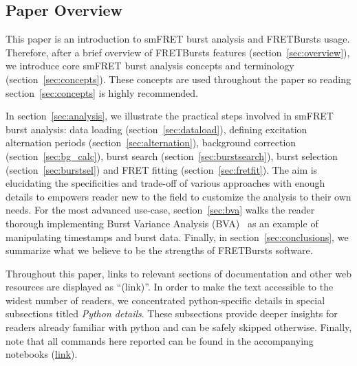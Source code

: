 \subsection{Paper Overview}
This paper is an introduction to smFRET burst analysis and FRETBursts usage.
Therefore, after a brief overview of FRETBursts features (section~\ref{sec:overview}),
we introduce core smFRET burst analysis concepts and terminology
(section~\ref{sec:concepts}). These concepts are used throughout the paper
so reading section~\ref{sec:concepts} is highly recommended.

In section~\ref{sec:analysis}, we illustrate the practical steps involved
in smFRET burst analysis: data loading (section~\ref{sec:dataload}), defining
excitation alternation periods (section~\ref{sec:alternation}), background
correction (section~\ref{sec:bg_calc}), burst search (section~\ref{sec:burstsearch}),
burst selection (section~\ref{sec:burstsel}) and FRET fitting (section~\ref{sec:fretfit}).
The aim is elucidating the specificities and trade-off of various approaches
with enough details to empowers reader new to the field to customize the analysis to their own needs.
For the most advanced use-case, section~\ref{sec:bva} walks the reader thorough implementing
Burst Variance Analysis (BVA)~\cite{Torella_2011} as an example of manipulating timestamps
and burst data.
Finally, in section~\ref{sec:conclusions}, we summarize what we believe to be
the strengths of FRETBursts software.

Throughout this paper,
links to relevant sections of documentation and other web resources
are displayed as ``(link)''.
In order to make the text accessible to the widest number of readers,
we concentrated python-specific details in special subsections titled
\textit{Python details}. These subsections provide deeper insights for readers
already familiar with python and can be safely skipped otherwise.
Finally, note that all commands here reported can be found in the
accompanying notebooks
(\href{https://github.com/tritemio/fretbursts_paper}{link}).
